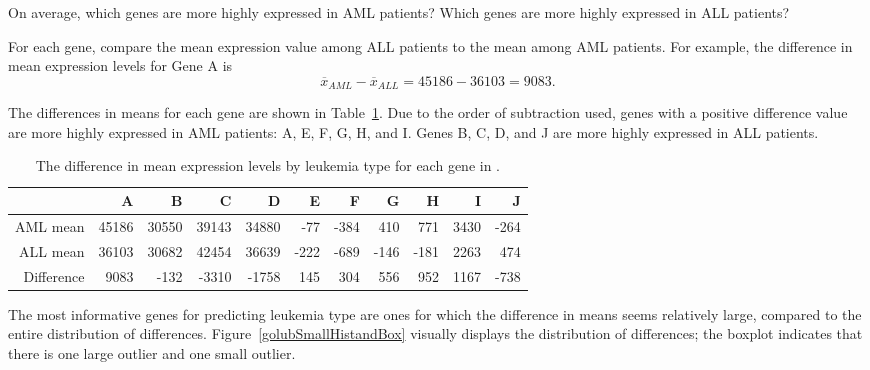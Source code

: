 \begin{example}{On average, which genes are more highly expressed in AML patients? Which genes are more highly expressed in ALL patients?}

For each gene, compare the mean expression value among ALL patients to the mean among AML patients. For example, the difference in mean expression levels for Gene A is
\[\overline{x}_{AML} - \overline{x}_{ALL} = 45186 - 36103 = 9083. \]	

The differences in means for each gene are shown in Table~\ref{golubSmallDiffinMeans}. Due to the order of subtraction used, genes with a positive difference value are more highly expressed in AML patients: A, E, F, G, H, and I. Genes B, C, D, and J are more highly expressed in ALL patients. 

\begin{table}[ht]
	\centering
	\footnotesize
	\begin{tabular}{rrrrrrrrrrr}
		\hline
		& A & B & C & D & E & F & G & H & I & J \\ 
		\hline
		AML mean & 45186 & 30550 & 39143 & 34880 & -77 & -384 & 410 & 771 & 3430 & -264 \\ 
		ALL mean & 36103 & 30682 & 42454 & 36639 & -222 & -689 & -146 & -181 & 2263 & 474 \\ 
		\hline
		Difference & 9083 & -132 & -3310 & -1758 & 145 & 304 & 556 & 952 & 1167 & -738 \\ 
		\hline
	\end{tabular}
	\caption{The difference in mean expression levels by leukemia type for each gene in .}
	\label{golubSmallDiffinMeans}
\end{table}
	
\end{example}

The most informative genes for predicting leukemia type are ones for which the difference in means seems relatively large, compared to the entire distribution of differences. Figure~\ref{golubSmallHistandBox} visually displays the distribution of differences; the boxplot indicates that there is one large outlier and one small outlier.  

